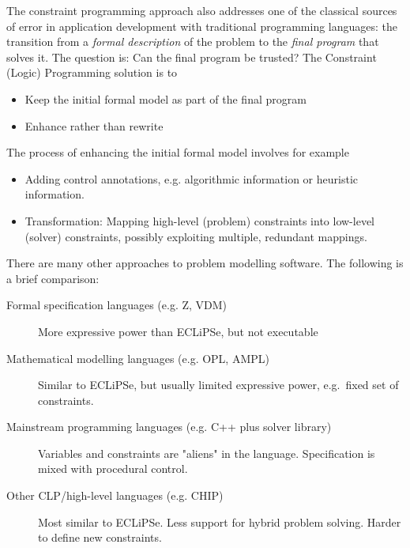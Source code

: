 The constraint programming approach also addresses one of the classical
sources of error in application development with
traditional programming languages: the transition from a
{\em formal description}
of the problem to the {\em final program} that solves it.
The question is: Can the final program be trusted?
The Constraint (Logic) Programming solution is to
\begin{itemize}
\item   Keep the initial formal model as part of the final program
\item   Enhance rather than rewrite
\end{itemize}
The process of enhancing the initial formal model involves for example
\begin{itemize}
\item Adding control annotations, e.g.
    algorithmic information or heuristic information.
\item Transformation:
    Mapping high-level (problem) constraints into
    low-level (solver) constraints,
    possibly exploiting multiple, redundant mappings.
\end{itemize}
There are many other approaches to problem modelling software.
The following is a brief comparison:
\begin{description}
\item[Formal specification languages (e.g. Z, VDM)]
    More expressive power than ECLiPSe, but not executable
\item[Mathematical modelling languages (e.g. OPL, AMPL)]
    Similar to ECLiPSe, but usually limited expressive power,
    e.g.\ fixed set of constraints.
\item[Mainstream programming languages (e.g. C++ plus solver library)]
    Variables and constraints are "aliens" in the language.
    Specification is mixed with procedural control.
\item[Other CLP/high-level languages (e.g. CHIP)]
    Most similar to ECLiPSe. Less support for hybrid problem solving.
    Harder to define new constraints.
\end{description}



